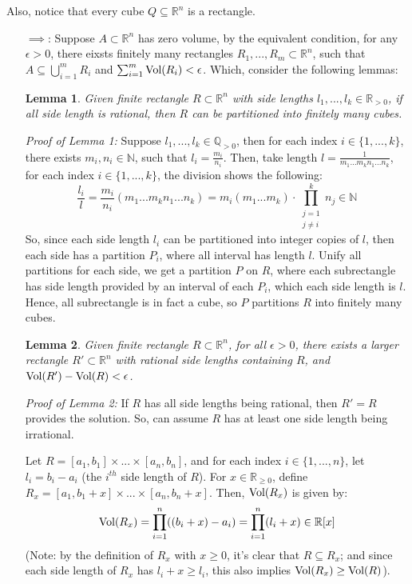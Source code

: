 \documentclass{article}
\newtheorem{lemma}{Lemma}
\begin{document}
Also, notice that every cube $Q\subseteq\mathbb{R}^n$ is a rectangle.
\begin{itemize}
    \item[$\implies$:] Suppose $A\subset\mathbb{R}^n$ has zero volume, by the equivalent condition, for any $\epsilon>0$, there eixsts finitely many rectangles $R_1,...,R_m\subset\mathbb{R}^n$, such that $A\subseteq \bigcup_{i=1}^{m}R_i$ and $\sum_{i=1}^{m}\textmd{Vol}(R_i)<\epsilon$. Which, consider the following lemmas:

    \begin{lemma}
        Given finite rectangle $R\subset\mathbb{R}^n$ with side lengths $l_1,...,l_k\in\mathbb{R}_{>0}$, if all side length is rational, then $R$ can be partitioned into finitely many cubes.
    \end{lemma}
    \textit{Proof of Lemma 1:} Suppose $l_1,...,l_k\in\mathbb{Q}_{>0}$, then for each index $i\in\{1,...,k\}$, there exists $m_i,n_i\in\mathbb{N}$, such that $l_i=\frac{m_i}{n_i}$. Then, take length $l=\frac{1}{m_1...m_kn_1...n_k}$, for each index $i\in\{1,...,k\}$, the division shows the following:
    \begin{equation}
        \frac{l_i}{l} = \frac{m_i}{n_i}(m_1...m_kn_1...n_k) = m_i(m_1...m_k)\cdot \prod_{\substack{j=1\\j\neq i}}^{k}n_j \in\mathbb{N}
    \end{equation}
    So, since each side length $l_i$ can be partitioned into integer copies of $l$, then each side has a partition $P_i$, where all interval has length $l$. Unify all partitions for each side, we get a partition $P$ on $R$, where each subrectangle has side length provided by an interval of each $P_i$, which each side length is $l$. Hence, all subrectangle is in fact a cube, so $P$ partitions $R$ into finitely many cubes.

    \begin{lemma}
        Given finite rectangle $R\subset\mathbb{R}^n$, for all $\epsilon>0$, there exists a larger rectangle $R'\subset\mathbb{R}^n$ with rational side lengths containing $R$, and $\textmd{Vol}(R')-\textmd{Vol}(R)<\epsilon$.
    \end{lemma}
    \textit{Proof of Lemma 2:} If $R$ has all side lengths being rational, then $R'=R$ provides the solution. So, can assume $R$ has at least one side length being irrational.

    Let $R = [a_1,b_1]\times ...\times [a_n,b_n]$, and for each index $i\in\{1,...,n\}$, let $l_i=b_i-a_i$ (the $i^{th}$ side length of $R$).  For $x\in\mathbb{R}_{\geq 0}$, define $R_x=[a_1,b_1+x]\times...\times[a_n,b_n+x]$. Then, $\textmd{Vol}(R_x)$ is given by:
    \begin{eqnarray}
        \textmd{Vol}(R_x)=\prod_{i=1}^{n}((b_i+x)-a_i) = \prod_{i=1}^{n}(l_i+x) \in \mathbb{R}[x]
    \end{eqnarray}
    (Note: by the definition of $R_x$ with $x\geq 0$, it's clear that $R\subseteq R_x$; and since each side length of $R_x$ has $l_i+x\geq l_i$, this also implies $\textmd{Vol}(R_x)\geq \textmd{Vol}(R)$).


\end{itemize}
\end{document}
